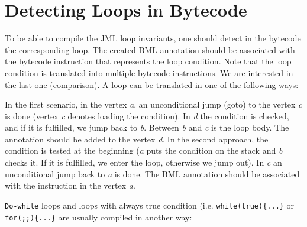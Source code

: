 \documentclass{acm_proc_article-sp}
\begin{document}
\section{Detecting Loops in Bytecode}\label{loopDetection}
To be able to compile the JML loop invariants, one should detect in the bytecode the corresponding loop. The created BML annotation should be associated with the bytecode instruction that represents the loop condition. Note that the loop condition is translated into multiple bytecode instructions. We are interested in the last one (comparison). A loop can be translated in one of the following ways:

\begin{figure}[h]
\end{figure}
In the first scenario, in the vertex \textit{a}, an unconditional jump (goto) to the vertex \textit{c} is done (vertex \textit{c} denotes loading the condition). In \textit{d} the condition is checked, and if it is fulfilled, we jump back to \textit{b}. Between \textit{b} and \textit{c} is the loop body. The annotation should be added to the vertex \textit{d}. In the second approach, the condition is tested at the beginning (\textit{a} puts the condition on the stack and \textit{b} checks it. If it is fulfilled, we enter the loop, otherwise we jump out). In \textit{c} an unconditional jump back to \textit{a} is done. The BML annotation should be associated with the instruction in the vertex \textit{a}.

\texttt{Do-while} loops and loops with always true condition (i.e. \texttt{while(true)\{...\}} or \texttt{for(;;)\{...\}} are usually compiled in another way:
\end{document}
